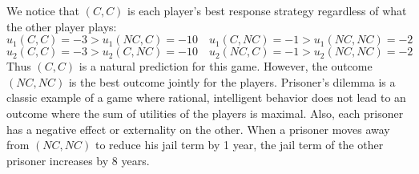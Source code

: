 We notice that $(C,C)$ is each player's best response strategy regardless of what the other player plays:
\[u_1(C,C)=-3>u_1(NC,C)=-10\quad u_1(C,NC)=-1>u_1(NC,NC)=-2\]
\[u_2(C,C)=-3>u_2(C,NC)=-10\quad u_2(NC,C)=-1>u_2(NC,NC)=-2\]
Thus $(C, C)$ is a natural prediction for this game.
However, the outcome $(NC,NC)$ is the best outcome jointly for the players.
Prisoner’s dilemma is a classic example of a game where rational, intelligent behavior does not lead to an outcome where the sum of utilities of the players is maximal.
Also, each prisoner has a negative effect or externality on the other.
When a prisoner moves away from $(NC,NC)$ to reduce his jail term by 1 year, the jail term of the other prisoner increases by 8 years.